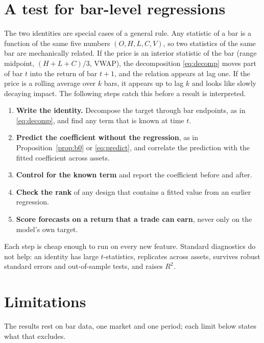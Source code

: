 \documentclass[11pt,a4paper]{article}
\begin{document}
\section{A test for bar-level regressions}
\label{sec:checklist}

The two identities are special cases of a general rule. Any statistic of a bar is a function of the same
five numbers $(O,H,L,C,V)$, so two statistics of the same bar are mechanically related. If the price is
an interior statistic of the bar (range midpoint, $(H+L+C)/3$, VWAP), the decomposition \eqref{eq:decomp}
moves part of bar $t$ into the return of bar $t+1$, and the relation appears at lag one. If the price is
a rolling average over $k$ bars, it appears up to lag $k$ and looks like slowly decaying impact. The
following steps catch this before a result is interpreted.

\begin{enumerate}
\item \textbf{Write the identity.} Decompose the target through bar endpoints, as in \eqref{eq:decomp},
and find any term that is known at time $t$.
\item \textbf{Predict the coefficient without the regression}, as in Proposition~\ref{prop:b0} or
\eqref{eq:predict}, and correlate the prediction with the fitted coefficient across assets.
\item \textbf{Control for the known term} and report the coefficient before and after.
\item \textbf{Check the rank} of any design that contains a fitted value from an earlier regression.
\item \textbf{Score forecasts on a return that a trade can earn}, never only on the model's own target.
\end{enumerate}

Each step is cheap enough to run on every new feature. Standard diagnostics do not help: an identity has large $t$-statistics, replicates across
assets, survives robust standard errors and out-of-sample tests, and raises $R^2$.

\section{Limitations}
\label{sec:limits}

The results rest on bar data, one market and one period; each limit below states what that excludes.
\end{document}
